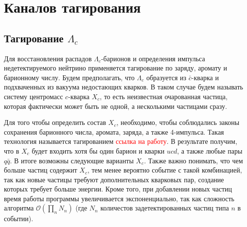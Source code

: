 \section{Каналов тагирования}
\label{taging}
\subsection{Тагирование $\Lambda_c$}

Для восстановления распадов $\Lambda_c$-барионов и определения импульса недетектируемого нейтрино применяется тагирование по заряду, аромату и барионному числу. Будем предполагать, что $\Lambda_c$ образуется из $\bar{c}$-кварка и подхваченных из вакуума недостающих кварков. В таком случае будем называть систему центромасс $c$-кварка $X_c$, то есть неизвестная очарованная частица, которая фактически может быть не одной, а несколькими частицами сразу.

\begin{figure}[h!]
    \centering
\end{figure}

Для того чтобы определить состав $X_c$, необходимо, чтобы соблюдались законы 
сохранения барионного числа, аромата, заряда, а также 4-импульса. Такая 
технология называется тагированием \textcolor{red}{ссылка на работу}. В 
результате получим, что в $X_c$ будет входить хотя бы один барион и кварки 
$u c d$, а также любые пары $q \bar{q}$. В итоге возможны следующие варианты 
$X_c$. Также важно понимать, что чем больше частиц содержит $X_c$, тем менее 
вероятно событие с такой комбинацией, так как новые частицы требуют 
дополнительных кварковых пар, создание которых требует больше энергии. 
Кроме того, при добавлении новых частиц время работы программы увеличивается 
экспоненциально, так как сложность алгоритма $\mathcal{O}(\prod_n N_n)$ 
(где $N_n$ количестов задетектированных частиц типа $n$ в событии).

